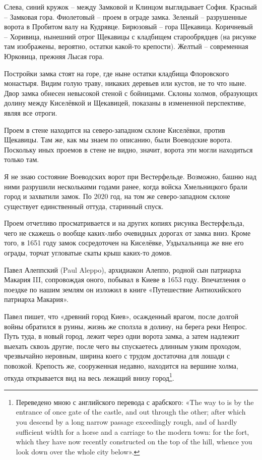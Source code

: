 Слева, синий кружок – между Замковой и Клинцом выглядывает София. Красный – Замковая гора. Фиолетовый – проем в ограде замка. Зеленый – разрушенные ворота в Пробитом валу на Кудрявце. Бирюзовый – гора Щекавица. Коричневый – Хоривица, нынешний отрог Щекавицы с кладбищем старообрядцев (на рисунке там изображены, вероятно, остатки какой-то крепости). Желтый – современная Юрковица, прежняя Лысая гора.

Постройки замка стоят на горе, где ныне остатки кладбища Флоровского монастыря. Видим голую траву, никаких деревьев или кустов, не то что ныне. Двор замка обнесен невысокой стеной с бойницами. Склоны холмов, образующих долину между Киселёвкой и Щекавицей, показаны в измененной перспективе, являя все отроги. 

Проем в стене находится на северо-западном склоне Киселёвки, против Щекавицы. Там же, как мы знаем по описанию, были Воеводские ворота. Поскольку иных проемов в стене не видно, значит, ворота эти могли находиться только там.

Я не знаю состояние Воеводских ворот при Вестерфельде. Возможно, башню над ними разрушили несколькими годами ранее, когда войска Хмельницкого брали город и захватили замок. По 2020 год, на том же северо-западном склоне существует единственный оттуда, старинный спуск.

Проем отчетливо просматривается и на других копиях рисунка Вестерфельда, чего не скажешь о вообще каких-либо очевидных дорогах от замка вниз. Кроме того, в 1651 году замок сосредоточен на Киселёвке, Уздыхальница же вне его ограды, торчат угловатые скаты крыш каких-то домов.

Павел Алеппский (Paul Aleppo), архидиакон Алеппо, родной сын патриарха Макария III, сопровождая оного, побывал в Киеве в 1653 году. Впечатления о поездке по нашим землям он изложил в книге «Путешествие Антиохийского патриарха Макария»\cite{alepp02}. 

Павел пишет, что «древний город Киев», осажденный врагом, после долгой войны обратился в руины, жизнь же сползла в долину, на берега реки Непрос. Путь туда, в новый город, лежит через одни ворота замка, а затем надлежит выехать сквозь другие, после чего вы спускаетесь длинным узким проходом, чрезвычайно неровным, ширина коего с трудом достаточна для лошади с повозкой. Крепость же, сооруженная недавно, находится на вершине холма, откуда открывается вид на весь лежащий внизу город\footnote{Переведено мною с английского перевода с арабского: «The way to is by the entrance of once gate of the castle, and out through the other; after which you descend by a long narrow passage exceedingly rough, and of hardly sufficient width for a horse and a carriage to the modern town: for the fort, which they have now recently constructed on the top of the hill, whence you look down over the whole city below».}.

